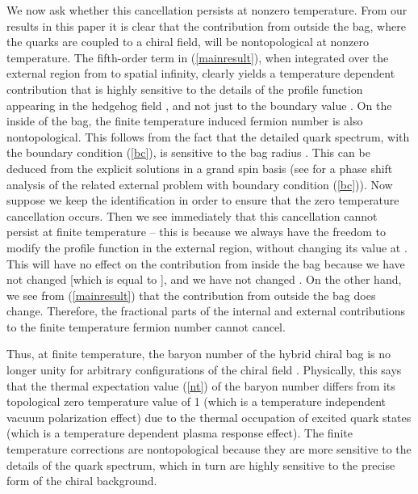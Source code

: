 \documentclass[a4paper,prd,showpacs,showkeys]{revtex4}
\begin{document}
{{We now ask whether this cancellation persists at nonzero temperature. From our results in this paper it is clear that the contribution from outside the bag, where the quarks are coupled to a chiral field, will be nontopological at nonzero temperature. The fifth-order term in (\ref{mainresult}), when integrated over the external region from \coordHE{} to spatial infinity, clearly yields a temperature dependent contribution that is highly sensitive to the details of the profile function \coordHE{} appearing in the hedgehog field \coordHE{}, and not just to the boundary value \coordHE{}. On the inside of the bag, the finite temperature induced fermion number is also nontopological. This follows from the fact that the detailed quark spectrum, with the boundary condition (\ref{bc}), is sensitive to the bag radius \coordHE{}. This can be deduced from  the explicit solutions in a grand spin basis (see \cite{farhi} for a phase shift analysis of the related external problem with boundary condition (\ref{bc})). Now suppose we keep the  identification \coordHE{} in order to ensure that the zero temperature cancellation occurs. Then we see immediately that this cancellation cannot persist at finite temperature -- this is because we always have the freedom to modify the profile function \coordHE{} in the external region, without changing its value at \coordHE{}. This will have no effect on the contribution from inside the bag because we have not changed \myHighlight{$\theta$}\coordHE{} [which is equal to \coordHE{}], and we have not changed \coordHE{}. On the other hand, we see from (\ref{mainresult}) that the contribution from outside the bag does change. Therefore, the fractional parts of the internal and external contributions to the finite temperature fermion number cannot cancel.

Thus, at finite temperature, the baryon number of the hybrid chiral bag is no longer unity for arbitrary configurations of the chiral field \coordHE{}. Physically, this says that the thermal expectation value (\ref{nt}) of the baryon number differs from its topological zero temperature value of 1 (which is a temperature independent vacuum polarization effect) due to the thermal occupation of excited quark states (which is a temperature dependent plasma response effect). The finite temperature corrections are nontopological because they are more sensitive to the details of the quark spectrum, which in turn are highly sensitive to the precise form of the chiral background.

}}
\end{document}
